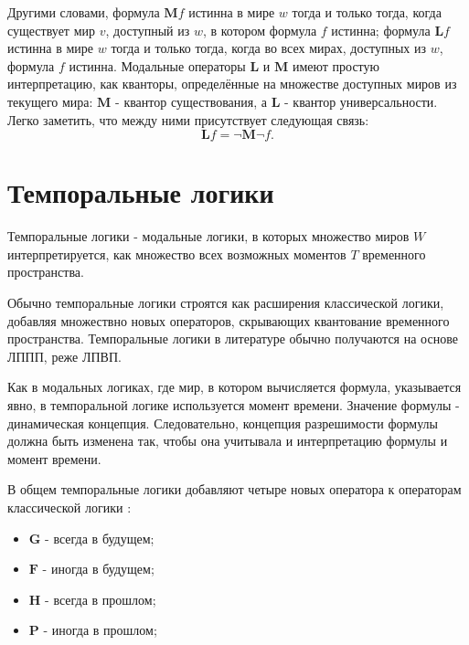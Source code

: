 		Другими словами, формула $ \textbf{M}f $ истинна в мире $ w $ тогда и только тогда, когда существует мир $ v $, доступный из $ w $, в котором формула $ f $  истинна; формула $ \textbf{L}f $ истинна в мире $ w $ тогда и только тогда, когда во всех мирах, доступных из $ w $,  формула $ f $ истинна.
		Модальные операторы $ \textbf{L} $ и $ \textbf{M} $ имеют простую интерпретацию, как кванторы, определённые на множестве доступных миров из текущего мира: $ \textbf{M} $ - квантор существования, а $ \textbf{L} $ - квантор универсальности. Легко заметить, что между ними присутствует следующая связь: \[ \textbf{L}f = \neg\textbf{M}\neg{f}. \]
		
%	
		
		
	\section{Темпоральные логики}
	 Темпоральные логики - модальные логики, в которых множество миров $ W $ интерпретируется, как множество всех возможных моментов $ T $ временного пространства.
	 
	 Обычно темпоральные логики строятся как расширения классической логики, добавляя множествно новых операторов, скрывающих квантование временного пространства.
	 Темпоральные логики в литературе обычно получаются на основе ЛППП, реже ЛПВП.
	 
	 Как в модальных логиках, где мир, в котором вычисляется формула, указывается явно, в темпоральной логике используется момент времени.
	 Значение формулы - динамическая концепция.
	 Следовательно, концепция разрешимости формулы должна быть изменена так, чтобы она учитывала и интерпретацию формулы и момент времени.
	 
	 В общем темпоральные логики добавляют четыре новых оператора к операторам классической логики \cite{Prior}:
	 \begin{itemize}
	 	\item $ \textbf{G} $ - всегда в будущем;
	 	\item $ \textbf{F} $ - иногда в будущем;
	 	\item $ \textbf{H} $ - всегда в прошлом;
	 	\item $ \textbf{P} $ - иногда в прошлом;
	 \end{itemize}
 
